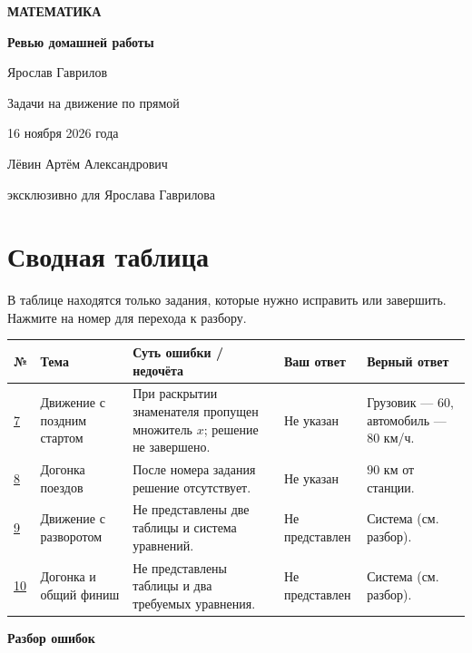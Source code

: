 \documentclass[a4paper,11pt]{article}
\begin{document}
\thispagestyle{empty}
\begin{center}
\vspace*{30mm}
{\Large\bfseries\color{darkaccent}МАТЕМАТИКА}\par
\vspace{24mm}
{\huge\bfseries Ревью домашней работы}\par
\vspace{6mm}
{\Large Ярослав Гаврилов}\par
\vspace{10mm}
{\large Задачи на движение по прямой}\par
\vspace{12mm}
{\large 16 ноября 2026 года}\par
\vfill
{\large Лёвин Артём Александрович}\par
{\small эксклюзивно для Ярослава Гаврилова}\par
\vspace{12mm}
\end{center}
\clearpage
\section*{Сводная таблица}
В таблице находятся только задания, которые нужно исправить или завершить. Нажмите на номер для перехода к разбору.
\vspace{4mm}\par
\noindent\begingroup\small
\setlength{\tabcolsep}{1.8pt}
\renewcommand{\arraystretch}{1.35}
\begin{tabularx}{\linewidth}{@{}>{\centering\arraybackslash}p{9mm} >{\raggedright\arraybackslash}p{30mm} X >{\raggedright\arraybackslash}p{28mm} >{\raggedright\arraybackslash}p{35mm}@{}}
\toprule
\textbf{№}&\textbf{Тема}&\textbf{Суть ошибки / недочёта}&\textbf{Ваш ответ}&\textbf{Верный ответ}\\
\midrule
\hyperref[task:7]{7}&Движение с поздним стартом&При раскрытии знаменателя пропущен множитель $x$; решение не завершено.&Не указан&Грузовик --- $60$, автомобиль --- $80$ км/ч.\\
\hyperref[task:8]{8}&Догонка поездов&После номера задания решение отсутствует.&Не указан&$90$ км от станции.\\
\hyperref[task:9]{9}&Движение с разворотом&Не представлены две таблицы и система уравнений.&Не представлен&Система (см. разбор).\\
\hyperref[task:10]{10}&Догонка и общий финиш&Не представлены таблицы и два требуемых уравнения.&Не представлен&Система (см. разбор).\\
\bottomrule
\end{tabularx}
\endgroup
\clearpage
\thispagestyle{empty}
\vspace*{0.37\textheight}
\begin{center}
{\Huge\bfseries\color{darkaccent}Разбор ошибок}
\end{center}
\end{document}
